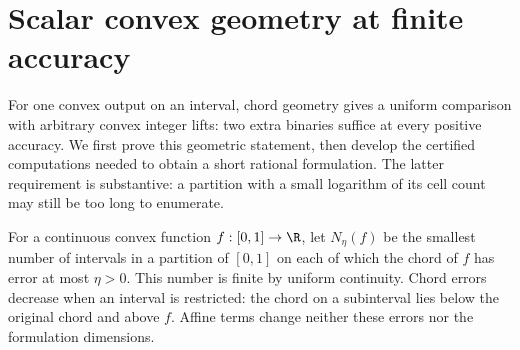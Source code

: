 \section{Scalar convex geometry at finite accuracy}\label{sec:scalar-geometry}

For one convex output on an interval, chord geometry gives a uniform
comparison with arbitrary convex integer lifts: two extra binaries
suffice at every positive accuracy. We first prove this geometric
statement, then develop the certified computations needed to obtain a
short rational formulation. The latter requirement is substantive:
a partition with a small logarithm of its cell count may still be too
long to enumerate.

For a continuous convex function $f:[0,1]\to\R$, let
$N_\eta(f)$ be the smallest number of intervals in a partition of
$[0,1]$ on each of which the chord of $f$ has error at most $\eta>0$.
This number is finite by uniform continuity. Chord errors decrease when
an interval is restricted: the chord on a subinterval lies below the
original chord and above $f$. Affine terms change neither these errors
nor the formulation dimensions.

